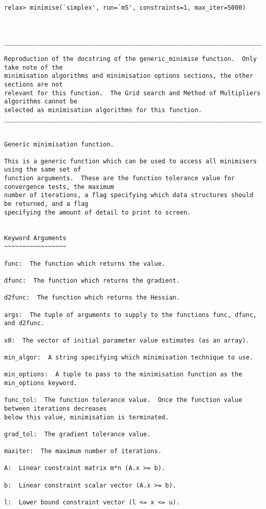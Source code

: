 {\begin{verbatim}
relax> minimise(`simplex', run=`m5', constraints=1, max_iter=5000)



____________________________________________________________________________________________

Reproduction of the docstring of the generic_minimise function.  Only take note of the
minimisation algorithms and minimisation options sections, the other sections are not
relevant for this function.  The Grid search and Method of Multipliers algorithms cannot be
selected as minimisation algorithms for this function.
____________________________________________________________________________________________


Generic minimisation function.

This is a generic function which can be used to access all minimisers using the same set of
function arguments.  These are the function tolerance value for convergence tests, the maximum
number of iterations, a flag specifying which data structures should be returned, and a flag
specifying the amount of detail to print to screen.


Keyword Arguments
~~~~~~~~~~~~~~~~~

func:  The function which returns the value.

dfunc:  The function which returns the gradient.

d2func:  The function which returns the Hessian.

args:  The tuple of arguments to supply to the functions func, dfunc, and d2func.

x0:  The vector of initial parameter value estimates (as an array).

min_algor:  A string specifying which minimisation technique to use.

min_options:  A tuple to pass to the minimisation function as the min_options keyword.

func_tol:  The function tolerance value.  Once the function value between iterations decreases
below this value, minimisation is terminated.

grad_tol:  The gradient tolerance value.

maxiter:  The maximum number of iterations.

A:  Linear constraint matrix m*n (A.x >= b).

b:  Linear constraint scalar vector (A.x >= b).

l:  Lower bound constraint vector (l <= x <= u).


\end{verbatim}}
